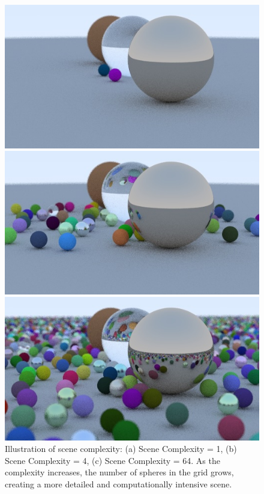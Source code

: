 \begin{figure}[htbp]
  \centering
  \begin{minipage}{0.3\textwidth}
    \centering
    \includegraphics[width=\linewidth]{images/image-sphere-grid-1.jpeg}
  \end{minipage}
  \begin{minipage}{0.3\textwidth}
    \centering
    \includegraphics[width=\linewidth]{images/image-sphere-grid-4.jpeg}
  \end{minipage}
  \begin{minipage}{0.3\textwidth}
    \centering
    \includegraphics[width=\linewidth]{images/image-sphere-grid-64.jpeg}
  \end{minipage}
  \caption{Illustration of scene complexity: (a) Scene Complexity = 1, (b) Scene Complexity = 4, (c) Scene Complexity = 64. As the complexity increases, the number of spheres in the grid grows, creating a more detailed and computationally intensive scene.}
  \label{fig:three_sphere_grids}
\end{figure}

